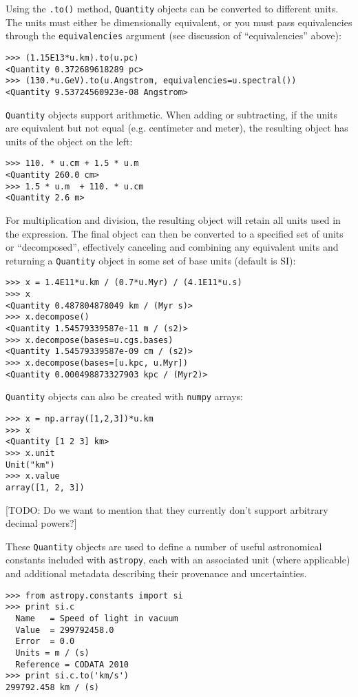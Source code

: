 \documentclass[traditabstract]{aa}
\begin{document}
Using the \texttt{.to()} method, \texttt{Quantity} objects can be
converted to different units. The units must either be dimensionally
equivalent, or you must pass equivalencies through the
\texttt{equivalencies} argument (see discussion of ``equivalencies''
above):
\begin{verbatim}
>>> (1.15E13*u.km).to(u.pc)
<Quantity 0.372689618289 pc>
>>> (130.*u.GeV).to(u.Angstrom, equivalencies=u.spectral())
<Quantity 9.53724560923e-08 Angstrom>
\end{verbatim}

\texttt{Quantity} objects support arithmetic. When adding or
subtracting, if the units are equivalent but not equal
(e.g. centimeter and meter), the resulting object has units of the
object on the left:
\begin{verbatim}
>>> 110. * u.cm + 1.5 * u.m
<Quantity 260.0 cm>
>>> 1.5 * u.m  + 110. * u.cm
<Quantity 2.6 m>
\end{verbatim}

For multiplication and division, the resulting object will retain all
units used in the expression. The final object can then be converted
to a specified set of units or ``decomposed'', effectively canceling
and combining any equivalent units and returning a \texttt{Quantity}
object in some set of base units (default is SI):

\begin{verbatim}
>>> x = 1.4E11*u.km / (0.7*u.Myr) / (4.1E11*u.s)
>>> x
<Quantity 0.487804878049 km / (Myr s)>
>>> x.decompose()
<Quantity 1.54579339587e-11 m / (s2)>
>>> x.decompose(bases=u.cgs.bases)
<Quantity 1.54579339587e-09 cm / (s2)>
>>> x.decompose(bases=[u.kpc, u.Myr])
<Quantity 0.000498873327903 kpc / (Myr2)>
\end{verbatim}

\texttt{Quantity} objects can also be created with \texttt{numpy}
arrays:
\begin{verbatim}
>>> x = np.array([1,2,3])*u.km
>>> x
<Quantity [1 2 3] km>
>>> x.unit
Unit("km")
>>> x.value
array([1, 2, 3])
\end{verbatim}

[TODO: Do we want to mention that they currently don't support
  arbitrary decimal powers?]

These \texttt{Quantity} objects are used to define a number of useful
astronomical constants included with \texttt{astropy}, each with an
associated unit (where applicable) and additional metadata describing
their provenance and uncertainties.
\begin{verbatim}
>>> from astropy.constants import si
>>> print si.c
  Name   = Speed of light in vacuum
  Value  = 299792458.0
  Error  = 0.0
  Units = m / (s)
  Reference = CODATA 2010
>>> print si.c.to('km/s')
299792.458 km / (s)
\end{verbatim}
\end{document}
